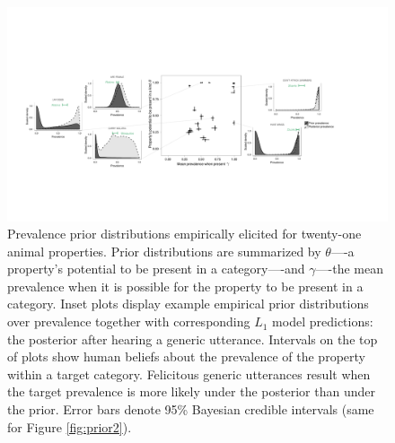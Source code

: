 \documentclass[12pt,letterpaper]{article}
\newcommand{\ndg}[1]{\textcolor{Green}{[ndg: #1]}}
\begin{document}
%
\begin{figure}
\centering
    \includegraphics[width=\columnwidth]{prevalence-scatter-wDists_wide.pdf}
    \caption{Prevalence prior distributions empirically elicited for twenty-one animal properties.
    Prior distributions are summarized by $\theta$----a property's potential to be present in a category----and $\gamma$----the mean prevalence when it is possible for the property to be present in a category.
    Inset plots display example empirical prior distributions over prevalence together with corresponding $L_1$ model predictions: the posterior after hearing a generic utterance. 
    Intervals on the top of plots show human beliefs about the prevalence of the property within a target category.
    Felicitous generic utterances result when the target prevalence is more likely under the posterior than under the prior.
     Error bars denote 95\% Bayesian credible intervals (same for Figure \ref{fig:prior2}).
    }
  \label{fig:priors1a}
\end{figure}
\end{document}
